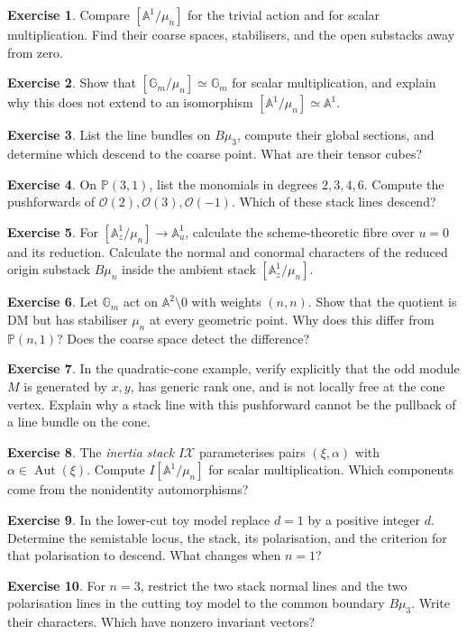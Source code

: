 \documentclass[11pt,a4paper]{article}
\numberwithin{equation}{section}
\theoremstyle{definition}
\newtheorem{exercise}{Exercise}
\newcommand{\A}{\mathbb A}
\newcommand{\PP}{\mathbb P}
\newcommand{\Gm}{\mathbb G_m}
\newcommand{\OO}{\mathcal O}
\newcommand{\cX}{\mathcal X}
\newcommand{\Aut}{\operatorname{Aut}}
\begin{document}
\begin{exercise}\label{ex:trivial}
Compare $[\A^1/\mu_n]$ for the trivial action and for scalar multiplication.
Find their coarse spaces, stabilisers, and the open substacks away from zero.
\end{exercise}
\begin{exercise}\label{ex:torsor}
Show that $[\Gm/\mu_n]\simeq\Gm$ for scalar multiplication, and explain why
this does not extend to an isomorphism $[\A^1/\mu_n]\simeq\A^1$.
\end{exercise}
\begin{exercise}\label{ex:bline}
List the line bundles on $B\mu_3$, compute their global sections, and determine
which descend to the coarse point. What are their tensor cubes?
\end{exercise}
\begin{exercise}\label{ex:weightcount}
On $\PP(3,1)$, list the monomials in degrees $2,3,4,6$. Compute the
pushforwards of $\OO(2),\OO(3),\OO(-1)$. Which of these stack lines descend?
\end{exercise}
\begin{exercise}\label{ex:fibre}
For $[\A^1_z/\mu_n]\to\A^1_u$, calculate the scheme-theoretic fibre over
$u=0$ and its reduction. Calculate the normal and conormal characters of
the reduced origin substack $B\mu_n$ inside the ambient stack
$[\A^1_z/\mu_n]$.
\end{exercise}
\begin{exercise}\label{ex:generic}
Let $\Gm$ act on $\A^2\setminus0$ with weights $(n,n)$. Show that the
quotient is DM but has stabiliser $\mu_n$ at every geometric point. Why
does this differ from $\PP(n,1)$? Does the coarse space detect the difference?
\end{exercise}
\begin{exercise}\label{ex:push}
In the quadratic-cone example, verify explicitly that the odd module $M$
is generated by $x,y$, has generic rank one, and is not locally free at
the cone vertex. Explain why a stack line with this pushforward cannot
be the pullback of a line bundle on the cone.
\end{exercise}
\begin{exercise}\label{ex:inertia}
The \emph{inertia stack} $I\cX$ parameterises pairs $(\xi,\alpha)$ with
$\alpha\in\Aut(\xi)$. Compute $I[\A^1/\mu_n]$ for scalar multiplication.
Which components come from the nonidentity automorphisms?
\end{exercise}
\begin{exercise}\label{ex:twist}
In the lower-cut toy model replace $d=1$ by a positive integer $d$.
Determine the semistable locus, the stack, its polarisation, and the
criterion for that polarisation to descend. What changes when $n=1$?
\end{exercise}
\begin{exercise}\label{ex:twonormals}
For $n=3$, restrict the two stack normal lines and the two polarisation
lines in the cutting toy model to the common boundary $B\mu_3$.
Write their characters. Which have nonzero invariant vectors?
\end{exercise}
\end{document}

